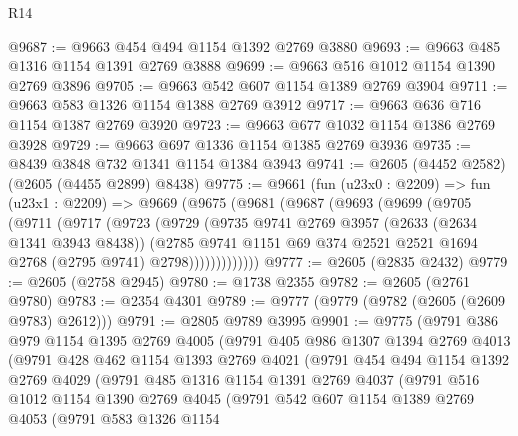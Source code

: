 \begin{lexlean}{R14}
\begin{coremodule}
@9687 := @9663 @454 @494 @1154 @1392 @2769 @3880
@9693 := @9663 @485 @1316 @1154 @1391 @2769 @3888
@9699 := @9663 @516 @1012 @1154 @1390 @2769 @3896
@9705 := @9663 @542 @607 @1154 @1389 @2769 @3904
@9711 := @9663 @583 @1326 @1154 @1388 @2769 @3912
@9717 := @9663 @636 @716 @1154 @1387 @2769 @3920
@9723 := @9663 @677 @1032 @1154 @1386 @2769 @3928
@9729 := @9663 @697 @1336 @1154 @1385 @2769 @3936
@9735 := @8439 @3848 @732 @1341 @1154 @1384 @3943
@9741 := @2605 (@4452 @2582) (@2605 (@4455 @2899) @8438)
@9775 := @9661
    (fun (u23x0 : @2209) =>
    fun (u23x1 : @2209) =>
    @9669
      (@9675
        (@9681
          (@9687
            (@9693
              (@9699
                (@9705
                  (@9711
                    (@9717
                      (@9723
                        (@9729
                          (@9735
                            @9741
                            @2769
                            @3957
                            (@2633 (@2634 @1341 @3943 @8438))
                            (@2785
                              @9741
                              @1151
                              @69
                              @374
                              @2521
                              @2521
                              @1694
                              @2768
                              (@2795 @9741)
                              @2798)))))))))))))
@9777 := @2605 (@2835 @2432)
@9779 := @2605 (@2758 @2945)
@9780 := @1738 @2355
@9782 := @2605 (@2761 @9780)
@9783 := @2354 @4301
@9789 := @9777 (@9779 (@9782 (@2605 (@2609 @9783) @2612)))
@9791 := @2805 @9789 @3995
@9901 := @9775
    (@9791
      @386
      @979
      @1154
      @1395
      @2769
      @4005
      (@9791
        @405
        @986
        @1307
        @1394
        @2769
        @4013
        (@9791
          @428
          @462
          @1154
          @1393
          @2769
          @4021
          (@9791
            @454
            @494
            @1154
            @1392
            @2769
            @4029
            (@9791
              @485
              @1316
              @1154
              @1391
              @2769
              @4037
              (@9791
                @516
                @1012
                @1154
                @1390
                @2769
                @4045
                (@9791
                  @542
                  @607
                  @1154
                  @1389
                  @2769
                  @4053
                  (@9791
                    @583
                    @1326
                    @1154

\end{coremodule}
\end{lexlean}
